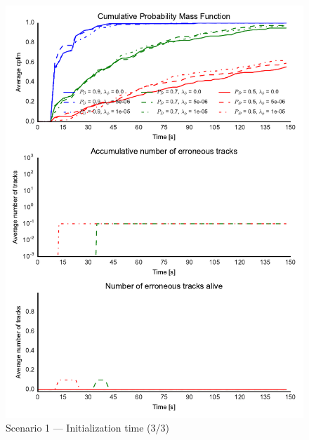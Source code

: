 \begin{figure}
\centering
\includegraphics{Figures/plots/Scenario1_Init-Time(3-3).pdf}
\caption{Scenario 1 --- Initialization time (3/3)}\label{fig:init1_time_3-3}
\end{figure}

